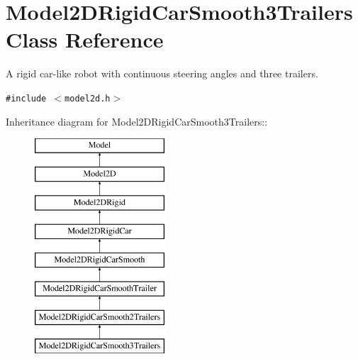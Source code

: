 \section{Model2DRigid\-Car\-Smooth3Trailers  Class Reference}
\label{class_Model2DRigidCarSmooth3Trailers}
A rigid car-like robot with continuous steering angles and three trailers. 


{\tt \#include $<$model2d.h$>$}

Inheritance diagram for Model2DRigid\-Car\-Smooth3Trailers::\begin{figure}[H]
\begin{center}
\leavevmode
\includegraphics[height=8cm]{class_Model2DRigidCarSmooth3Trailers}
\end{center}
\end{figure}
